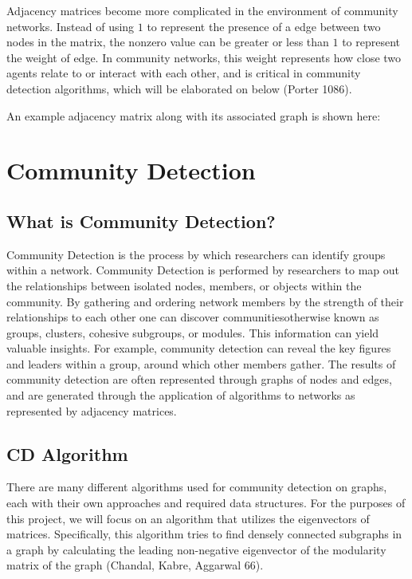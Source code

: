 \documentclass{article}
\begin{document}
Adjacency matrices become more complicated in the environment of community networks. 
Instead of using $1$ to represent the presence of a edge between two nodes in the matrix, the nonzero value can be greater or less than $1$ to represent the weight of edge.
In community networks, this weight represents how close two agents relate to or interact with each other, and is critical in community detection algorithms, which will be elaborated on below (Porter 1086).    

\bigskip

An example adjacency matrix along with its associated graph is shown here:

\bigskip 

\bigskip

\section{Community Detection}

\subsection{What is Community Detection?}

Community Detection is the process by which researchers can identify groups within a network.
Community Detection is performed by researchers to map out the relationships between isolated nodes, members, or objects within the community. 
By gathering and ordering network members by the strength of their relationships to each other one can discover communities\textemdash otherwise known as groups, clusters, cohesive subgroups, or modules. 
This information can yield valuable insights. For example, community detection can reveal the key figures and leaders within a group, around which other members gather.
The results of community detection are often represented through graphs of nodes and edges, and are generated through the application of algorithms to networks as represented by adjacency matrices.

\subsection{CD Algorithm}
There are many different algorithms used for community detection on graphs, each with their own approaches and required data structures. 
For the purposes of this project, we will focus on an algorithm that utilizes the eigenvectors of matrices. 
Specifically, this algorithm tries to find densely connected subgraphs in a graph by calculating the leading non-negative eigenvector of the modularity matrix of the graph (Chandal, Kabre, Aggarwal 66). 
\end{document}
